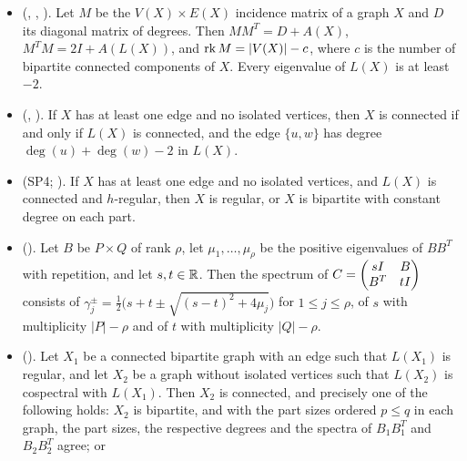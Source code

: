 \begin{itemize}
  $\rho$, then $BB^T$ and $B^TB$ are positive semidefinite, have the same positive eigenvalues
  with multiplicities, and have $\mult_{BB^T}(0)=|P|-\rho$ and $\mult_{B^TB}(0)=|Q|-\rho$.
 \item {}
  (, ,
  ). Let $M$ be the $V(X)\times E(X)$
  incidence matrix of a graph $X$ and $D$ its diagonal matrix of degrees. Then $MM^T=D+A(X)$,
  $M^TM=2I+A(L(X))$, and $\mathop{\mathrm{rk}}\nolimits M=|V(X)|-c$, where $c$ is the number of bipartite connected
  components of $X$. Every eigenvalue of $L(X)$ is at least $-2$.
 \item {}
  (, ).
  If $X$ has at least one edge and no isolated vertices, then $X$ is connected if and only if
  $L(X)$ is connected, and the edge $\{u,w\}$ has degree $\deg(u)+\deg(w)-2$ in $L(X)$.
 \item {} (SP4;
  ). If $X$ has at least one edge
  and no isolated vertices, and $L(X)$ is connected and $h$-regular, then $X$ is regular, or $X$
  is bipartite with constant degree on each part.
 \item {}
  (). Let $B$ be $P\times Q$ of rank $\rho$,
  let $\mu_1,\dots,\mu_\rho$ be the positive eigenvalues of $BB^T$ with repetition, and
  let $s,t\in{\mathbb R}$. Then the spectrum of $C=\begin{pmatrix} sI&B\\B^T&tI \end{pmatrix}$ consists of
  $\gamma_j^{\pm}=\frac12\bigl(s+t\pm\sqrt{(s-t)^2+4\mu_j}\bigr)$ for $1\le j\le\rho$,
  of $s$ with multiplicity $|P|-\rho$ and of $t$ with multiplicity $|Q|-\rho$.
 \item {}
  (). Let $X_1$ be a connected bipartite graph
  with an edge such that $L(X_1)$ is regular, and let $X_2$ be a graph without isolated vertices
  such that $L(X_2)$ is cospectral with $L(X_1)$. Then $X_2$ is connected, and precisely one of
  the following holds: $X_2$ is bipartite, and with the part sizes ordered $p\le q$ in each graph,
  the part sizes, the respective degrees and the spectra of $B_1B_1^T$ and $B_2B_2^T$ agree; or

\end{itemize}
